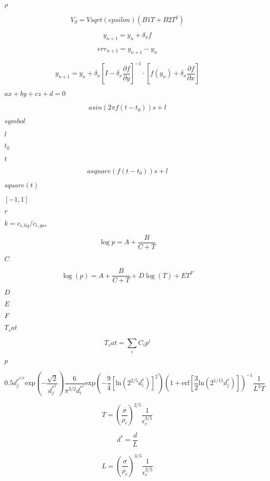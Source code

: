 \documentclass{article}
\begin{document}
$\rho$
\pagebreak

\[ V_d = V sqrt(epsilon)(B1 T + B2 T^2) \]
\pagebreak

\[ y_{n+1} = y_n + \delta_x f \]
\pagebreak

\[ err_{n+1} = y_{n+1} - y_n \]
\pagebreak

\[ y_{n+1} = y_n + \delta_x\left[I - \delta_x\frac{\partial f}{\partial y}\right]^{-1} \cdot \left[f(y_n) + \delta_x\frac{\partial f}{\partial x}\right] \]
\pagebreak

$ ax + by + cz + d = 0 $
\pagebreak

\[ a sin(2 \pi f (t - t_0)) s + l \]
\pagebreak

$ symbol $
\pagebreak

$ l $
\pagebreak

$ t_0 $
\pagebreak

$ t $
\pagebreak

\[ a square(f (t - t_0)) s + l \]
\pagebreak

$ square(t) $
\pagebreak

$ [-1, 1] $
\pagebreak

$ r $
\pagebreak

$k = c_{i,liq}/c_{i,gas}$
\pagebreak

\[ \log p = A + \frac{B}{C + T} \]
\pagebreak

$C$
\pagebreak

\[ \log (p) = A + \frac{B}{C + T} + D \log (T) + E T^F \]
\pagebreak

$D$
\pagebreak

$E$
\pagebreak

$F$
\pagebreak

$T_sat$
\pagebreak

\[ T_sat = \sum_i C_i p^i \]
\pagebreak

$p$
\pagebreak

\[ 0.5 d_j^{*^{5/3}} \mathrm{exp}\left(-\frac{\sqrt{2}}{d_j^{*^{3}}}\right) \frac{6}{\pi^{3/2}d_i^{*^{3}}} \mathrm{exp} \left( - \frac{9}{4}\left[\mathrm{ln}\left(2^{2/5} d_i^{*}\right)\right]^{2} \right) \left( 1 + \mathrm{erf} \left[ \frac{3}{2}\mathrm{ln} \left(2^{1/15} d_j^{*}\right) \right] \right)^{-1} \frac{1}{L^{3}T} \]
\pagebreak

\[ T = \left(\frac{\sigma}{\rho_c}\right)^{2/5} \frac{1}{\epsilon_c^{3/5}} \]
\pagebreak

\[ d^{*} = \frac{d}{L} \]
\pagebreak

\[ L = \left(\frac{\sigma}{\rho_c}\right)^{3/5} \frac{1}{\epsilon_c^{2/5}} \]
\pagebreak
\end{document}
